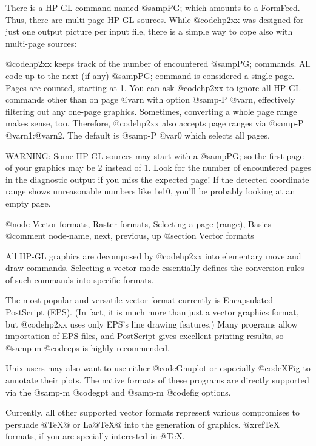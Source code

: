 There is a HP-GL command named @samp{PG;} which amounts to a FormFeed.
Thus, there are multi-page HP-GL sources. While @code{hp2xx} was
designed for just one output picture per input file, there is a
simple way to cope also with multi-page sources:

@code{hp2xx} keeps track of the number of encountered @samp{PG;} commands.
All code up to the next (if any) @samp{PG;} command is considered a
single page. Pages are counted, starting at 1. You can ask @code{hp2xx}
to ignore all HP-GL commands other than on page @var{n} with option
@samp{-P @var{n}}, effectively filtering out any one-page graphics.
Sometimes, converting a whole page range makes sense, too. Therefore,
@code{hp2xx} also accepts page ranges via @samp{-P @var{n1}:@var{n2}}.
The default is @samp{-P @var{0}} which selects all pages.

WARNING: Some HP-GL sources may start with a @samp{PG;} so the first
page of your graphics may be 2 instead of 1. Look for the number of
encountered pages in the diagnostic output if you miss the expected page!
If the detected coordinate range shows unreasonable numbers like 1e10,
you'll be probably looking at an empty page.




@node Vector formats, Raster formats, Selecting a page (range), Basics
@comment  node-name,  next,  previous,  up
@section Vector formats

All HP-GL graphics are decomposed by @code{hp2xx} into elementary
move and draw commands. Selecting a vector mode essentially defines the
conversion rules of such commands into specific formats.

The most popular and versatile vector format currently is
Encapsulated PostScript (EPS). (In fact, it is much more than just a
vector graphics format, but @code{hp2xx} uses only EPS's line drawing
features.) Many programs allow importation of EPS files, and PostScript
gives excellent printing results, so @samp{-m @code{eps}} is highly
recommended.

Unix users may also want to use either @code{Gnuplot} or especially @code{XFig}
to annotate their plots. The native formats of these programs are directly
supported via the @samp{-m @code{gpt}} and @samp{-m @code{fig}} options.

Currently, all other supported vector formats represent various compromises
to persuade @TeX{}@ or La@TeX{}@ into the generation of graphics.
@xref{TeX formats}, if you are specially interested in @TeX{}.



